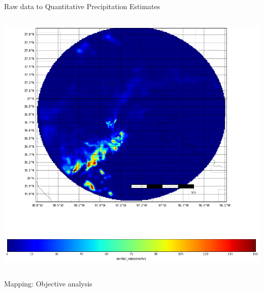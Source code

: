 \documentclass[final]{beamer}
\begin{document}
\begin{frame}{}
\begin{columns}[t]
\begin{column}{.3\linewidth}
\begin{block}{Raw data to Quantitative Precipitation Estimates}
\begin{columns}[t]
\begin{column}{.5\linewidth}
\begin{columns}[t]
\begin{column}{.5\linewidth}
			\includegraphics[width=1.0\linewidth]{figures/qpe.png}\\[1ex]  
		
		\end{column}
		\end{columns}
 		\end{column}
	\end{columns}
      \end{block}
       \begin{block}{Mapping: Objective analysis}
         \end{block}



\end{column}
\end{columns}
\end{frame}
\end{document}
